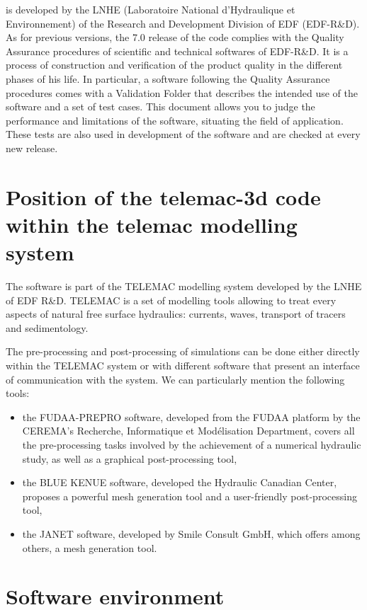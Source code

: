  is developed by the LNHE (Laboratoire National d'Hydraulique et
Environnement) of the Research and Development Division of EDF (EDF-R\&D). As
for previous versions, the 7.0 release of the code complies with the Quality
Assurance procedures of scientific and technical softwares of EDF-R\&D. It is a
process of construction and verification of the product quality in the
different phases of his life. In particular, a software following the Quality
Assurance procedures comes with a Validation Folder that describes the intended
use of the software and a set of test cases. This document allows you to judge
the performance and limitations of the software, situating the field of
application. These tests are also used in development of the software and are
checked at every new release.

\section{Position of the telemac-3d code within the telemac modelling system}

The  software is part of the TELEMAC modelling system developed by
the LNHE of EDF R\&D. TELEMAC is a set of modelling tools allowing to treat
every aspects of natural free surface hydraulics: currents, waves, transport of
tracers and sedimentology.

The pre-processing and post-processing of simulations can be done either
directly within the TELEMAC system or with different software that present an
interface of communication with the system. We can particularly mention the
following tools:

\begin{itemize}
\item the FUDAA-PREPRO software, developed from the FUDAA platform
by the CEREMA's Recherche, Informatique et Modélisation Department, covers all
the pre-processing tasks involved by the achievement of a numerical hydraulic
study, as well as a graphical post-processing tool,
\item the BLUE KENUE software, developed the Hydraulic Canadian
Center, proposes a powerful mesh generation tool and a user-friendly
post-processing tool,
\item the JANET software, developed by Smile Consult GmbH, which offers among
others, a mesh generation tool.
\end{itemize}


\section{Software environment}

